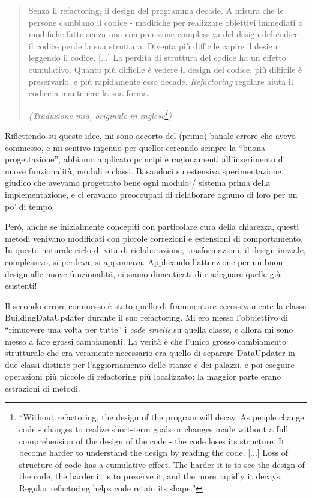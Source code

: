 \documentclass[12pt]{report}
\begin{document}
\begin{quote}
Senza il refactoring, il design del programma decade. A misura che le persone
cambiano il codice - modifiche per realizzare obiettivi immediati o modifiche
fatte senza una comprensione complessiva del design del codice - il codice
perde la sua struttura. Diventa più difficile capire il design leggendo
il codice. [...] La perdita di struttura del codice ha un effetto cumulativo.
Quanto più difficile è vedere il design del codice, più difficile è 
preservarlo, e più rapidamente esso decade. \textit{Refactoring} regolare aiuta
il codice a mantenere la sua forma. \cite{fowler2002} 

\flushright
\textit{(Traduzione mia, originale in inglese\footnote{
``Without 
refactoring, the design of the program will decay. As people change
code - changes to realize short-term goals or changes made without a full
comprehension of the design of the code - the code loses its structure. 
It become harder to understand the design by reading the code. [...] 
Loss of structure of code has a cumulative effect. The harder 
it is to see the design of the code, the harder it is to preserve 
it, and the more rapidly it decays. Regular refactoring helps 
code retain its shape.''
})
}
\end{quote}

Riflettendo su queste idee, mi sono accorto del
(primo) banale errore che avevo commesso, e mi 
sentivo ingenuo per quello: cercando sempre la ``buona progettazione'', 
abbiamo applicato principi e ragionamenti all'inserimento di nuove 
funzionalità, moduli e classi. Basandoci su estensiva sperimentazione, 
giudico che avevamo progettato bene ogni modulo / sistema 
prima della implementazione, e ci eravamo preoccupati 
di rielaborare ognuno di loro per un po' di tempo.

Però, anche se inizialmente concepiti con particolare cura della chiarezza, 
questi metodi venivano modificati con piccole correzioni e estensioni di 
comportamento. In questo naturale ciclo di vita di rielaborazione, 
trasformazioni, il design iniziale, complessivo, si perdeva, si appannava. 
Applicando l'attenzione per un buon design alle nuove funzionalità, ci 
siamo dimenticati di riadeguare quelle già esistenti!

Il secondo errore commesso è stato quello di frammentare eccessivamente la
classe BuildingDataUpdater durante il suo refactoring. Mi ero messo l'obbiettivo
di ``rimuovere una volta per tutte'' i \textit{code smells} su quella classe,
e allora mi sono messo a fare grossi cambiamenti. La verità è che l'unico
grosso cambiamento strutturale che era veramente necessario era quello di separare
DataUpdater in due classi distinte per l'aggiornamento delle stanze e dei 
palazzi, e poi eseguire operazioni più piccole di refactoring più localizzato:
la maggior parte erano estrazioni di metodi.
\end{document}
